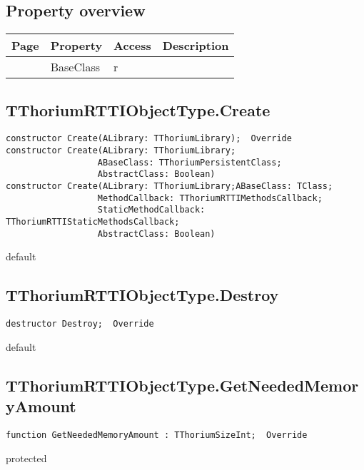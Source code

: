 \subsection{Property overview}
\label{thoriumcore:thorium:tthoriumrttiobjecttype:properties}
\begin{tabularx}{\textwidth}{lllX}
Page & Property & Access & Description \\ \hline
\pageref{thoriumcore:thorium:tthoriumrttiobjecttype:baseclass} & BaseClass & r &  \\
\hline
\end{tabularx}
\subsection{TThoriumRTTIObjectType.Create}
\label{thoriumcore:thorium:tthoriumrttiobjecttype:create}
\begin{FPCList}
\Synopsis
\Declaration 

\begin{verbatim}
constructor Create(ALibrary: TThoriumLibrary);  Override
constructor Create(ALibrary: TThoriumLibrary;
                  ABaseClass: TThoriumPersistentClass;
                  AbstractClass: Boolean)
constructor Create(ALibrary: TThoriumLibrary;ABaseClass: TClass;
                  MethodCallback: TThoriumRTTIMethodsCallback;
                  StaticMethodCallback: TThoriumRTTIStaticMethodsCallback;
                  AbstractClass: Boolean)
\end{verbatim}
\Visibility
default
\Description
\Errors
\end{FPCList}
\subsection{TThoriumRTTIObjectType.Destroy}
\label{thoriumcore:thorium:tthoriumrttiobjecttype:destroy}
\begin{FPCList}
\Synopsis
\Declaration 

\begin{verbatim}
destructor Destroy;  Override
\end{verbatim}
\Visibility
default
\Description
\Errors
\end{FPCList}
\subsection{TThoriumRTTIObjectType.GetNeededMemoryAmount}
\label{thoriumcore:thorium:tthoriumrttiobjecttype:getneededmemoryamount}
\begin{FPCList}
\Synopsis
\Declaration 

\begin{verbatim}
function GetNeededMemoryAmount : TThoriumSizeInt;  Override
\end{verbatim}
\Visibility
protected
\Description
\Errors
\end{FPCList}
